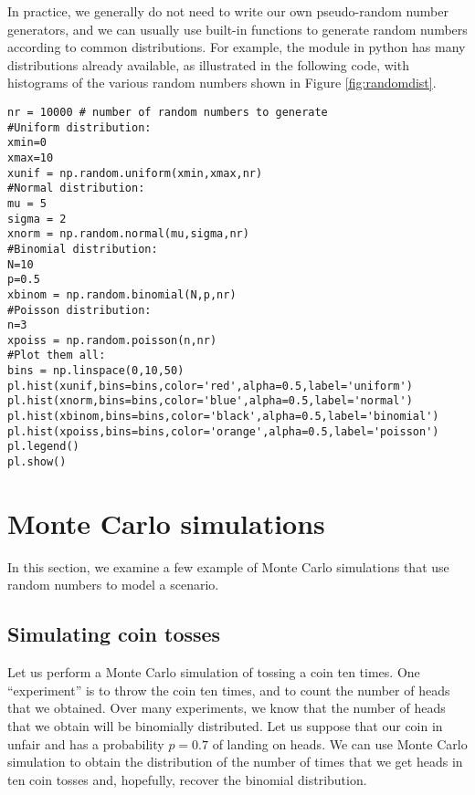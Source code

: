 In practice, we generally do not need to write our own pseudo-random number generators, and we can usually use built-in functions to generate random numbers according to common distributions. For example, the  module in python has many distributions already available, as illustrated in the following code, with histograms of the various random numbers shown in Figure \ref{fig:randomdist}.
\begin{lstlisting}[frame=single] 
nr = 10000 # number of random numbers to generate
#Uniform distribution:
xmin=0
xmax=10
xunif = np.random.uniform(xmin,xmax,nr)
#Normal distribution:
mu = 5
sigma = 2
xnorm = np.random.normal(mu,sigma,nr)
#Binomial distribution:
N=10
p=0.5
xbinom = np.random.binomial(N,p,nr)
#Poisson distribution:
n=3
xpoiss = np.random.poisson(n,nr)
#Plot them all:
bins = np.linspace(0,10,50)
pl.hist(xunif,bins=bins,color='red',alpha=0.5,label='uniform')
pl.hist(xnorm,bins=bins,color='blue',alpha=0.5,label='normal')
pl.hist(xbinom,bins=bins,color='black',alpha=0.5,label='binomial')
pl.hist(xpoiss,bins=bins,color='orange',alpha=0.5,label='poisson')
pl.legend()
pl.show()
\end{lstlisting}

\section{Monte Carlo simulations}
In this section, we examine a few example of Monte Carlo simulations that use random numbers to model a scenario.
\subsection{Simulating coin tosses}
Let us perform a Monte Carlo simulation of tossing a coin ten times. One ``experiment'' is to throw the coin ten times, and to count the number of heads that we obtained. Over many experiments, we know that the number of heads that we obtain will be binomially distributed. Let us suppose that our coin in unfair and has a probability $p=0.7$ of landing on heads. We can use Monte Carlo simulation to obtain the distribution of the number of times that we get heads in ten coin tosses and, hopefully, recover the binomial distribution.

